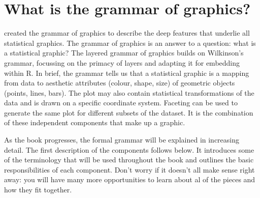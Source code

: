 
\section{What is the grammar of graphics?}

\citet{wilkinson:2006} created the grammar of graphics to describe the deep features that underlie all statistical graphics.  The grammar of graphics is an answer to a question: what is a statistical graphic?  The layered grammar of graphics \citep{wickham:2007d} builds on Wilkinson's grammar, focussing on the primacy of layers and adapting it for embedding within R.  In brief, the grammar tells us that a statistical graphic is a mapping from data to  aesthetic attributes (colour, shape, size) of geometric objects (points, lines, bars).  The plot may also contain statistical transformations of the data and is drawn on a specific coordinate system.  Faceting can be used to generate the same plot for different subsets of the dataset.  It is the combination of these independent components that make up a graphic.  

As the book progresses, the formal grammar will be explained in increasing detail. The first description of the components follows below. It introduces some of the terminology that will be used throughout the book and outlines the basic responsibilities of each component.  Don't worry if it doesn't all make sense right away: you will have many more opportunities to learn about al of the pieces and how they fit together.

